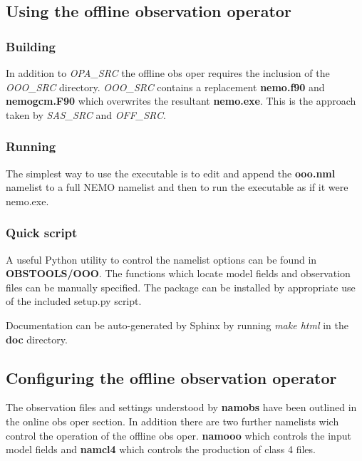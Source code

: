 \documentclass[NEMO_book]{subfiles}
\begin{document}
\subsection{Using the offline observation operator}

\subsubsection{Building}

In addition to \emph{OPA\_SRC} the offline obs oper requires the inclusion
of the \emph{OOO\_SRC} directory. \emph{OOO\_SRC} contains a replacement \textbf{nemo.f90} and
\textbf{nemogcm.F90} which overwrites the resultant \textbf{nemo.exe}. This is the approach taken
by \emph{SAS\_SRC} and \emph{OFF\_SRC}.

\subsubsection{Running}

The simplest way to use the executable is to edit and append the \textbf{ooo.nml} namelist to
a full NEMO namelist and then to run the executable as if it were nemo.exe. 

\subsubsection{Quick script}

A useful Python utility to control the namelist options can be found in \textbf{OBSTOOLS/OOO}. The
functions which locate model fields and observation files can be manually specified. The package
can be installed by appropriate use of the included setup.py script.

Documentation can be auto-generated by Sphinx by running \emph{make html} in the \textbf{doc} directory.

\subsection{Configuring the offline observation operator}
The observation files and settings understood by \textbf{namobs} have been outlined in the online
obs oper section. In addition there are two further namelists wich control the operation of the offline
obs oper. \textbf{namooo} which controls the input model fields and \textbf{namcl4} which controls the
production of class 4 files. 
\end{document}
